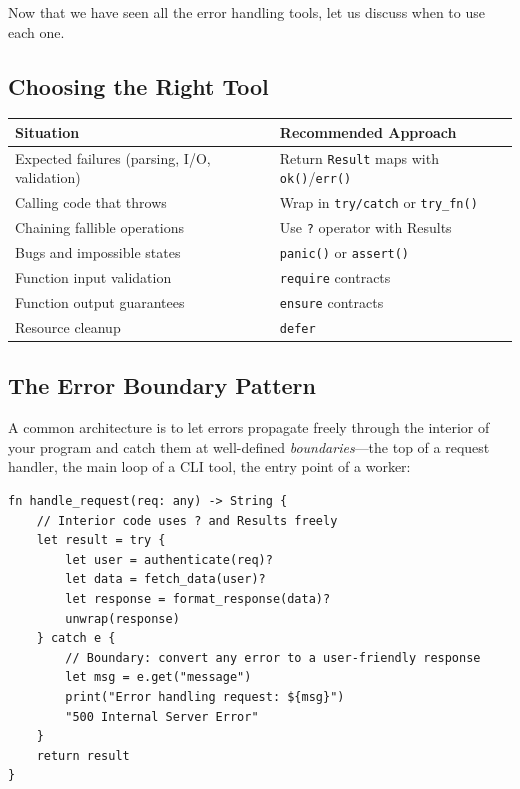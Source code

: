 Now that we have seen all the error handling tools, let us discuss when to use each one.

\subsection{Choosing the Right Tool}\label{sec:choosing-error-tool}

\begin{center}
\begin{tabular}{p{4cm}p{8cm}}
\toprule
\textbf{Situation} & \textbf{Recommended Approach} \\
\midrule
Expected failures (parsing, I/O, validation) & Return \lstinline|Result| maps with \lstinline|ok()|/\lstinline|err()| \\
Calling code that throws & Wrap in \lstinline|try/catch| or \lstinline|try_fn()| \\
Chaining fallible operations & Use \lstinline|?| operator with Results \\
Bugs and impossible states & \lstinline|panic()| or \lstinline|assert()| \\
Function input validation & \lstinline|require| contracts \\
Function output guarantees & \lstinline|ensure| contracts \\
Resource cleanup & \lstinline|defer| \\
\bottomrule
\end{tabular}
\end{center}

\subsection{The Error Boundary Pattern}\label{sec:error-boundary}

A common architecture is to let errors propagate freely through the interior of your program and catch them at well-defined \emph{boundaries}---the top of a request handler, the main loop of a CLI tool, the entry point of a worker:

\begin{lstlisting}[language=Lattice, caption={The error boundary pattern}]
fn handle_request(req: any) -> String {
    // Interior code uses ? and Results freely
    let result = try {
        let user = authenticate(req)?
        let data = fetch_data(user)?
        let response = format_response(data)?
        unwrap(response)
    } catch e {
        // Boundary: convert any error to a user-friendly response
        let msg = e.get("message")
        print("Error handling request: ${msg}")
        "500 Internal Server Error"
    }
    return result
}
\end{lstlisting}

